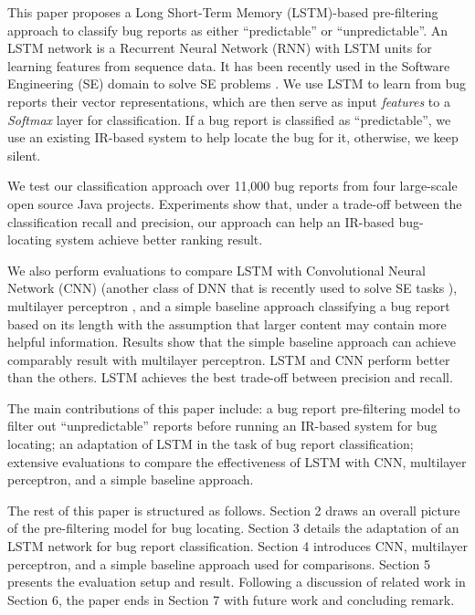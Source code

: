 This paper proposes a Long Short-Term Memory (LSTM)-based pre-filtering approach to classify bug reports as either ``predictable'' or ``unpredictable''. An LSTM network is a Recurrent Neural Network (RNN) with LSTM units \cite{Hochreiter:1997:LSM:1246443.1246450} for learning features from sequence data. It has been recently used in the Software Engineering (SE) domain to solve SE problems \cite{8255666, Huo:2017:EUF:3172077.3172153}. We use LSTM to learn from bug reports their vector representations, which are then serve as input \textit{features} to a \textit{Softmax} layer for classification. If a bug report is classified as ``predictable'', we use an existing IR-based system to help locate the bug for it, otherwise, we keep silent.

We test our classification approach over 11,000 bug reports from four large-scale open source Java projects. Experiments show that, under a trade-off between the classification recall and precision, our approach can help an IR-based bug-locating system achieve better ranking result.

We also perform evaluations to compare LSTM with Convolutional Neural Network (CNN) \cite{726791} (another class of DNN that is recently used to solve SE tasks \cite{Le:2015:IRS:2786805.2786880, Xu:2016:PSL:2970276.2970357, Mou:2016:CNN:3015812.3016002}), multilayer perceptron \cite{Hornik:1989:MFN:70405.70408}, and a simple baseline approach classifying a bug report based on its length with the assumption that larger content may contain more helpful information. Results show that the simple baseline approach can achieve comparably result with multilayer perceptron. LSTM and CNN perform better than the others. LSTM achieves the best trade-off between precision and recall. 

The main contributions of this paper include: a bug report pre-filtering model to filter out ``unpredictable'' reports before running an IR-based system for bug locating; an adaptation of LSTM in the task of bug report classification; extensive evaluations to compare the effectiveness of LSTM with CNN, multilayer perceptron, and a simple baseline approach.

The rest of this paper is structured as follows. Section 2 draws an overall picture of the pre-filtering model for bug locating. Section 3 details the adaptation of an LSTM network for bug report classification. Section 4 introduces CNN, multilayer perceptron, and a simple baseline approach used for comparisons. Section 5 presents the evaluation setup and result. Following a discussion of related work in Section 6, the paper ends in Section 7 with future work and concluding remark.

